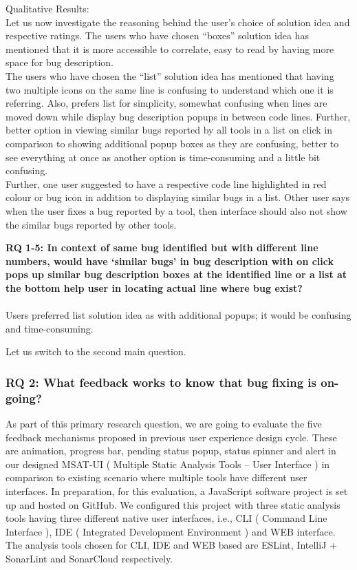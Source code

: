 Qualitative Results: \\

Let us now investigate the reasoning behind the user’s choice of solution idea and respective ratings. The users who have chosen “boxes” solution idea has mentioned that it is more accessible to correlate, easy to read by having more space for bug description. \\

The users who have chosen the “list” solution idea has mentioned that having two multiple icons on the same line is confusing to understand which one it is referring. Also, prefers list for simplicity, somewhat confusing when lines are moved down while display bug description popups in between code lines. Further,  better option in viewing similar bugs reported by all tools in a list on click in comparison to showing additional popup boxes as they are confusing, better to see everything at once as another option is time-consuming and a little bit confusing. \\

Further, one user suggested to have a respective code line highlighted in red colour or bug icon in addition to displaying similar bugs in a list. Other user says when the user fixes a bug reported by a tool, then interface should also not show the similar bugs reported by other tools. \\

\begin{myboxi}{{\textbf{RQ 1-5: In context of same bug identified but with different line numbers, would have ‘similar bugs’ in bug description with on click pops up similar bug description boxes at the identified line or a list at the bottom help user in locating actual line where bug exist?}}}
	\\ \\ Users preferred list solution idea as with additional popups; it would be confusing and time-consuming. \\
\end{myboxi}


Let us switch to the second main question.

\subsubsection{RQ 2: What feedback works to know that bug fixing is on-going?}

As part of this primary research question, we are going to evaluate the five feedback mechanisms proposed in previous user experience design cycle. These are animation, progress bar, pending status popup, status spinner and alert in our designed MSAT-UI ( Multiple Static Analysis Tools – User Interface ) in comparison to existing scenario where multiple tools have different user interfaces. In preparation, for this evaluation, a JavaScript software project is set up and hosted on GitHub. We configured this project with three static analysis tools having three different native user interfaces, i.e., CLI ( Command Line Interface ), IDE ( Integrated Development Environment ) and WEB interface. The analysis tools chosen for CLI, IDE and WEB based are ESLint, IntelliJ + SonarLint and SonarCloud respectively. \\

